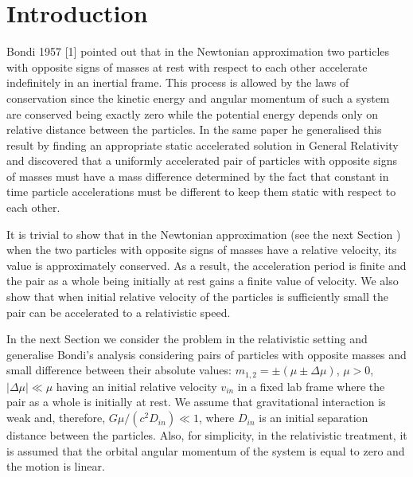 \documentclass[aip,nofootinbib]{revtex4}
\begin{document}
\maketitle

\section{Introduction}


Bondi 1957 [1] pointed out that in the Newtonian approximation two
particles with opposite signs of masses at rest with respect to
each other accelerate indefinitely in an inertial frame. This
process is allowed by the laws of conservation  since the kinetic
energy and angular momentum of such a system are conserved being
exactly zero while the potential energy depends only on relative
distance between the particles. In the same paper he generalised
this result by finding an appropriate static accelerated solution
in General Relativity and discovered that a uniformly accelerated
pair of particles with opposite signs of masses must have a mass
difference determined by the fact that constant in time particle
accelerations  must be different to keep them static with respect
to each other.


It is trivial to show that in the Newtonian approximation (see the
next Section ) when the two particles with opposite signs of
masses have a relative velocity, its value is approximately
conserved. As a result, the acceleration period is finite and the
pair as a whole being initially at rest gains a finite value of
velocity. We also show that when initial relative velocity of the
particles is sufficiently small the pair can be accelerated to a
relativistic speed.




In the next Section we consider the problem in the relativistic
setting and generalise Bondi's analysis considering pairs of
particles with opposite masses and small difference between their
absolute values: $m_{1,2}=\pm (\mu\pm \Delta \mu) $, $\mu
> 0$, $|\Delta \mu | \ll \mu$  having an initial relative velocity
$v_{in}$ in a fixed lab frame where the pair as a whole is
initially at rest. We assume that gravitational interaction is
weak and, therefore, $G\mu/(c^2 D_{in})\ll 1$, where $D_{in}$ is
an initial separation distance between the particles. Also, for
simplicity, in the relativistic treatment, it is assumed that the
orbital angular momentum of the system is equal to zero and the
motion is linear.
\end{document}
